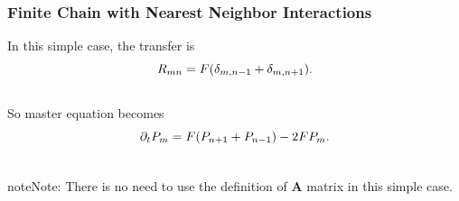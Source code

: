 \documentclass[letterpaper,10pt,english]{sphinxmanual}
\begin{document}
\subsubsection{Finite Chain with Nearest Neighbor Interactions}
\label{nonequilibrium/week10:finite-chain-with-nearest-neighbor-interactions}
In this simple case, the transfer is
\begin{gather}
\begin{split}R_{mn} = F(\delta_{m,n-1}+ \delta_{m,n+1}) .\end{split}\notag\\\begin{split}\end{split}\notag
\end{gather}
So master equation becomes
\begin{gather}
\begin{split}\partial_t P_m = F(P_{n+1} + P_{n-1}) -2F P_m .\end{split}\notag\\\begin{split}\end{split}\notag
\end{gather}
\begin{notice}{note}{Note:}
There is no need to use the definition of $\mathbf A$ matrix in this simple case.
\end{notice}
\end{document}
